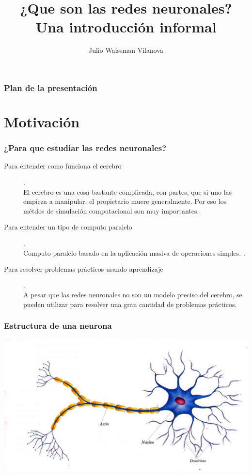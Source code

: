 \documentclass{beamer}
\title[Redes neuronales] %
{¿Que son las redes neuronales? \\Una introducción informal}
\author[Waissman]{Julio Waissman Vilanova}
\institute[Botón Rojo] %
{Departamento de Matem\'aticas\\
  \textbf{Universidad de Sonora}\\
  para \textbf{Botón Rojo}
}
\date{}
\begin{document}
\begin{frame}
  \titlepage
\end{frame}

\begin{frame}
  \frametitle{Plan de la presentación}
  \tableofcontents
\end{frame}

\section{Motivación}

\begin{frame}
  \frametitle{¿Para que estudiar las redes neuronales?}
  \begin{description}
  \item[Para entender como funciona el cerebro].\\
    El cerebro es una cosa bastante complicada, con partes, que si uno las
    empieza a manipular, el propietario muere generalmente. Por eso los
    métdos de simulación computacional son muy importantes.
    
  \item[Para entender un tipo de computo paralelo].\\  Computo paralelo
    basado en la aplicación masiva de operaciones simples. .
    
  \item[\alert{Para resolver problemas prácticos usando aprendizaje}].\\
    A pesar que las redes neuronales no son un modelo preciso del
    cerebro, se pueden utilizar para resolver una gran cantidad de
    problemas prácticos.
  \end{description}
  
\end{frame}

\begin{frame}
  \frametitle{Estructura de una neurona}
  \includegraphics[width=\textwidth]{neurona.jpg}
\end{frame}
\end{document}
